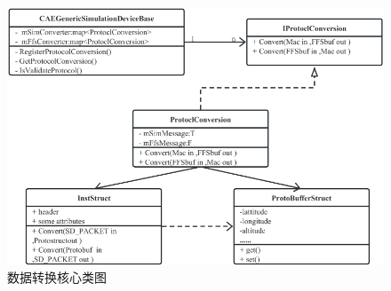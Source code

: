 \begin{figure}[h!]
    \begin{center}
        \includegraphics[width=\textwidth]{pictures/classdiagram2.pdf}
        \caption{数据转换核心类图}
        \label{module22}
    \end{center}
\end{figure}
